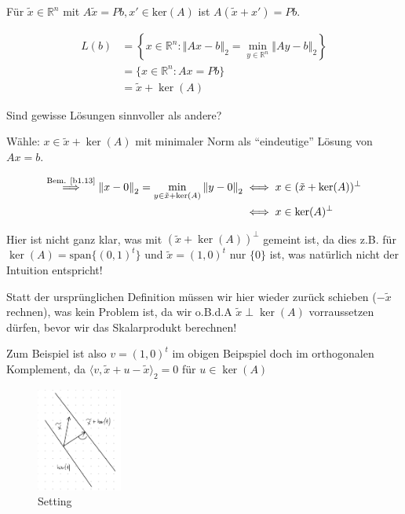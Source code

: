 \documentclass{book}
\def\R{\mathbb{R}}
\begin{document}
            Für $\tilde{x}\in\R^n$ mit $A\tilde{x}=Pb,x'\in\text{ker}(A)$ ist $A(\tilde{x}+x')=Pb$.

            \begin{align*}
                L(b)&=\left\{x\in\R^n:\left\Vert Ax-b \right\Vert_2 = \min_{y\in\R^n} \left\Vert Ay-b \right\Vert_2\right\}\\
                &=\{x\in\R^n:Ax=Pb\}\\
                &=\tilde{x}+\ker(A)
            \end{align*}

            Sind gewisse Lösungen sinnvoller als andere?

            Wähle: $x\in\tilde{x}+\ker(A)$ mit minimaler Norm als ``eindeutige'' Lösung von $Ax=b$.

            \begin{align*}
                \stackrel{\text{Bem. \ref{b1.13}}}{\implies} \left\Vert x-0 \right\Vert_2 = \min_{y\in \tilde{x}+ \ker(A)} \left\Vert y-0 \right\Vert_2 &\iff x\in (\tilde{x}+\ker(A))^\perp \\
                &\iff x\in \ker(A)^\perp 
            \end{align*}

            \begin{tcolorbox}[enhanced,breakable,
                title=Anmerkung]
                Hier ist nicht ganz klar, was mit $(\tilde{x}+\ker(A))^\perp$ gemeint ist, da dies z.B. für $\ker(A)=\text{span}\{(0,1)^t\}$ und $\tilde{x}=(1,0)^t$ nur $\{0\}$ ist, was natürlich nicht der Intuition entspricht!
                
                Statt der ursprünglichen Definition müssen wir hier wieder zurück schieben ($-\tilde{x}$ rechnen), was kein Problem ist, da wir o.B.d.A $\tilde{x}\perp \ker(A)$ vorraussetzen dürfen, bevor wir das Skalarprodukt berechnen!

                Zum Beispiel ist also $v=(1,0)^t$ im obigen Beipspiel doch im orthogonalen Komplement, da $\langle v, \tilde{x}+u-\tilde{x}\rangle_2=0$ für $u\in \ker(A)$
            \end{tcolorbox}
            
            \begin{figure}[H]
                \centering
                \includegraphics[width=0.25\textwidth]{Bild010}
                \caption{Setting}
            \end{figure}
\end{document}
